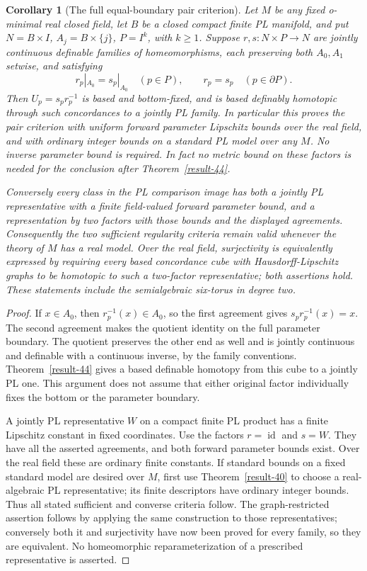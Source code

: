\documentclass[11pt,a4paper]{article}
\newtheorem{corollary}[theorem]{Corollary}
\theoremstyle{definition}
\begin{document}
\begin{corollary}[The full equal-boundary pair criterion]\label{result-53}
Let $M$ be any fixed o-minimal real closed field, let $B$ be a closed
compact finite PL manifold, and put $N=B\times I$, $A_j=B\times\{j\}$,
$P=I^k$, with $k\ge1$. Suppose $r,s:N\times P\to N$ are jointly
continuous definable families of homeomorphisms, each preserving both
$A_0,A_1$ setwise, and satisfying
\[
 r_p|_{A_0}=s_p|_{A_0}\quad(p\in P),\qquad
 r_p=s_p\quad(p\in\partial P).
\]
Then $U_p=s_pr_p^{-1}$ is based and bottom-fixed, and is based
definably homotopic through such concordances to a jointly PL family.
In particular this proves the pair criterion with uniform forward
parameter Lipschitz bounds over the real field, and with ordinary
integer bounds on a standard PL model over any $M$. No inverse
parameter bound is required. In fact no metric bound on these factors
is needed for the conclusion after Theorem~\ref{result-44}.

Conversely every class in the PL comparison image has both a jointly
PL representative with a finite field-valued forward parameter bound,
and a representation by two factors with those bounds and the displayed
agreements. Consequently the two sufficient regularity criteria remain
valid whenever the theory of $M$ has a real model. Over the real field,
surjectivity is equivalently expressed by requiring every based
concordance cube with Hausdorff-Lipschitz graphs to be homotopic to such
a two-factor representative; both assertions hold. These statements
include the semialgebraic six-torus in degree two.
\end{corollary}
\begin{proof}
If $x\in A_0$, then $r_p^{-1}(x)\in A_0$, so the first agreement
gives $s_pr_p^{-1}(x)=x$. The second agreement makes the quotient
identity on the full parameter boundary. The quotient preserves the
other end as well and is jointly continuous and definable with a
continuous inverse, by the family conventions. Theorem~\ref{result-44}
gives a based definable homotopy from this cube to a jointly PL one.
This argument does not assume that either original factor individually
fixes the bottom or the parameter boundary.

A jointly PL representative $W$ on a compact finite PL product has a
finite Lipschitz constant in fixed coordinates. Use the factors
$r=\operatorname{id}$ and $s=W$. They have all the asserted agreements,
and both forward parameter bounds exist. Over the real field these
are ordinary finite constants. If standard bounds on a fixed standard
model are desired over $M$, first use Theorem~\ref{result-40} to choose
a real-algebraic PL representative; its finite descriptors have
ordinary integer bounds. Thus all stated sufficient and converse
criteria follow. The graph-restricted assertion follows by applying
the same construction to those representatives; conversely both it
and surjectivity have now been proved for every family, so they are
equivalent. No homeomorphic reparameterization of a prescribed
representative is asserted.
\end{proof}
\end{document}
